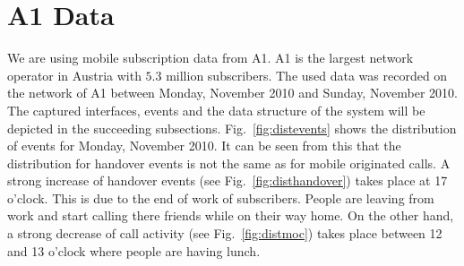 \documentclass[master,english]{hgbthesis}
\begin{document}
\section{A1 Data}
We are using mobile subscription data from A1. A1 is the largest network operator in Austria with $5.3$ million subscribers. The used data was recorded on the network of A1 between Monday,  November 2010 and Sunday,  November 2010. The captured interfaces, events and the data structure of the system will be depicted in the succeeding subsections.
Fig.~\ref{fig:distevents} shows the distribution of events for Monday,  November 2010. It can be seen from this that the distribution for handover events is not the same as for mobile originated calls. A strong increase of handover events (see Fig.~\ref{fig:disthandover}) takes place at 17 o'clock. This is due to the end of work of subscribers. People are leaving from work and start calling there friends while on their way home. On the other hand, a strong decrease of call activity (see Fig.~\ref{fig:distmoc}) takes place between 12 and 13 o'clock where people are having lunch.
\end{document}
